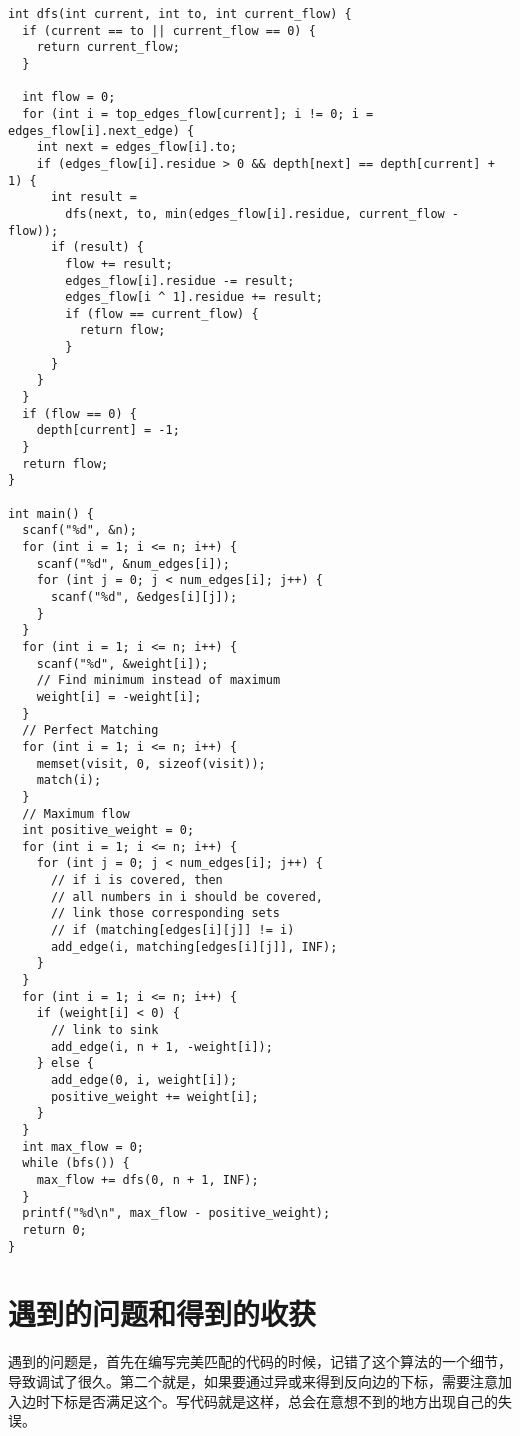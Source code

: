 \documentclass[11pt]{article}
\begin{document}
\begin{verbatim}
int dfs(int current, int to, int current_flow) {
  if (current == to || current_flow == 0) {
    return current_flow;
  }

  int flow = 0;
  for (int i = top_edges_flow[current]; i != 0; i = edges_flow[i].next_edge) {
    int next = edges_flow[i].to;
    if (edges_flow[i].residue > 0 && depth[next] == depth[current] + 1) {
      int result =
        dfs(next, to, min(edges_flow[i].residue, current_flow - flow));
      if (result) {
        flow += result;
        edges_flow[i].residue -= result;
        edges_flow[i ^ 1].residue += result;
        if (flow == current_flow) {
          return flow;
        }
      }
    }
  }
  if (flow == 0) {
    depth[current] = -1;
  }
  return flow;
}

int main() {
  scanf("%d", &n);
  for (int i = 1; i <= n; i++) {
    scanf("%d", &num_edges[i]);
    for (int j = 0; j < num_edges[i]; j++) {
      scanf("%d", &edges[i][j]);
    }
  }
  for (int i = 1; i <= n; i++) {
    scanf("%d", &weight[i]);
    // Find minimum instead of maximum
    weight[i] = -weight[i];
  }
  // Perfect Matching
  for (int i = 1; i <= n; i++) {
    memset(visit, 0, sizeof(visit));
    match(i);
  }
  // Maximum flow
  int positive_weight = 0;
  for (int i = 1; i <= n; i++) {
    for (int j = 0; j < num_edges[i]; j++) {
      // if i is covered, then
      // all numbers in i should be covered,
      // link those corresponding sets
      // if (matching[edges[i][j]] != i)
      add_edge(i, matching[edges[i][j]], INF);
    }
  }
  for (int i = 1; i <= n; i++) {
    if (weight[i] < 0) {
      // link to sink
      add_edge(i, n + 1, -weight[i]);
    } else {
      add_edge(0, i, weight[i]);
      positive_weight += weight[i];
    }
  }
  int max_flow = 0;
  while (bfs()) {
    max_flow += dfs(0, n + 1, INF);
  }
  printf("%d\n", max_flow - positive_weight);
  return 0;
}

\end{verbatim}

\section{遇到的问题和得到的收获}
\label{sec:orge7df106}
遇到的问题是，首先在编写完美匹配的代码的时候，记错了这个算法的一个细节，导致调试了很久。第二个就是，如果要通过异或来得到反向边的下标，需要注意加入边时下标是否满足这个。写代码就是这样，总会在意想不到的地方出现自己的失误。
\end{document}

